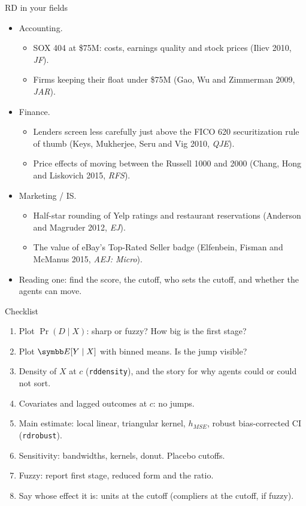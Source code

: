 \documentclass[aspectratio=169,11pt]{beamer}
\begin{document}
\begin{frame}{RD in your fields}
\small
\begin{itemize}
	\item \alert{Accounting.}
	\begin{itemize}
		\item SOX 404 at \$75M: costs, earnings quality and stock prices (Iliev 2010, \emph{JF}).
		\item Firms keeping their float under \$75M (Gao, Wu and Zimmerman 2009, \emph{JAR}).
	\end{itemize}
	\item \alert{Finance.}
	\begin{itemize}
		\item Lenders screen less carefully just above the FICO 620 securitization rule of thumb (Keys,
		Mukherjee, Seru and Vig 2010, \emph{QJE}).
		\item Price effects of moving between the Russell 1000 and 2000 (Chang, Hong and Liskovich 2015, \emph{RFS}).
	\end{itemize}
	\item \alert{Marketing / IS.}
	\begin{itemize}
		\item Half-star rounding of Yelp ratings and restaurant reservations (Anderson and Magruder 2012, \emph{EJ}).
		\item The value of eBay's Top-Rated Seller badge (Elfenbein, Fisman and McManus 2015, \emph{AEJ: Micro}).
	\end{itemize}
	\item Reading one: find the score, the cutoff, who sets the cutoff, and whether the agents can move.
\end{itemize}
\end{frame}


\begin{frame}{Checklist}
\begin{enumerate}
	\item Plot $\Pr(D \mid X)$: sharp or fuzzy? How big is the first stage?
	\item Plot $\E[Y \mid X]$ with binned means. Is the jump visible?
	\item Density of $X$ at $c$ (\texttt{rddensity}), and the story for why agents could or could not sort.
	\item Covariates and lagged outcomes at $c$: no jumps.
	\item Main estimate: local linear, triangular kernel, $h_{MSE}$, robust bias-corrected CI (\texttt{rdrobust}).
	\item Sensitivity: bandwidths, kernels, donut. Placebo cutoffs.
	\item Fuzzy: report first stage, reduced form and the ratio.
	\item Say whose effect it is: units at the cutoff (compliers at the cutoff, if fuzzy).
\end{enumerate}
\end{frame}
\end{document}
